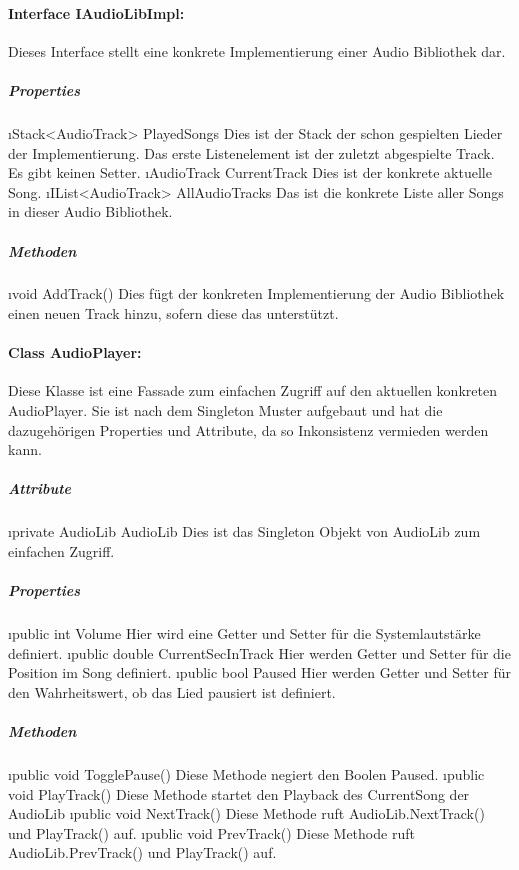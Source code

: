 \documentclass[../entwurf.tex]{subfiles}
\begin{document}
			\paragraph{Interface IAudioLibImpl:}
				Dieses Interface stellt eine konkrete Implementierung einer Audio Bibliothek dar.
				\subparagraph{Properties}
					\begin{itemize}
						\i{Stack<AudioTrack> PlayedSongs} Dies ist der Stack der schon gespielten Lieder der Implementierung.
						Das erste Listenelement ist der zuletzt abgespielte Track. Es gibt keinen Setter. 
						\i{AudioTrack CurrentTrack} Dies ist der konkrete aktuelle Song.
						\i{IList<AudioTrack> AllAudioTracks} Das ist die konkrete Liste aller Songs in dieser Audio Bibliothek.
					\end{itemize}
				\subparagraph{Methoden}
					\begin{itemize}
						\i{void AddTrack()} Dies fügt der konkreten Implementierung der Audio Bibliothek einen neuen Track hinzu, sofern
						diese das unterstützt.
					\end{itemize}
			\paragraph{Class AudioPlayer:}
				Diese Klasse ist eine Fassade zum einfachen Zugriff auf den aktuellen konkreten AudioPlayer. 
				Sie ist nach dem Singleton Muster aufgebaut und hat die dazugehörigen Properties und Attribute, 
				da so Inkonsistenz vermieden werden kann. 
				\subparagraph{Attribute}
					\begin{itemize}
						\i{private AudioLib AudioLib} Dies ist das Singleton Objekt von AudioLib zum einfachen Zugriff.
					\end{itemize}
				\subparagraph{Properties}
					\begin{itemize}
						\i{public int Volume} Hier wird eine Getter und Setter für die Systemlautstärke definiert.
						\i{public double CurrentSecInTrack} Hier werden Getter und Setter für die Position im Song definiert.
						\i{public bool Paused} Hier werden Getter und Setter für den Wahrheitswert, ob das Lied pausiert ist definiert.
					\end{itemize}
				\subparagraph{Methoden}
					\begin{itemize}
						\i{public void TogglePause()} Diese Methode negiert den Boolen Paused.
						\i{public void PlayTrack()} Diese Methode startet den Playback des CurrentSong der AudioLib
						\i{public void NextTrack()} Diese Methode ruft AudioLib.NextTrack() und PlayTrack() auf.
						\i{public void PrevTrack()} Diese Methode ruft AudioLib.PrevTrack() und PlayTrack() auf.
					\end{itemize}
\end{document}
